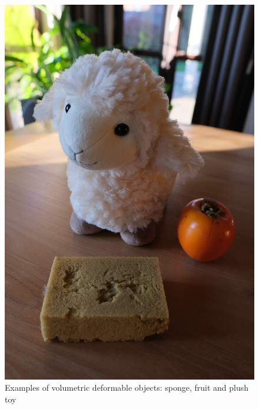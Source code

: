 \begin{figure}[htbp!]
    \centering
    \includegraphics[keepaspectratio,width=\textwidth]{figures/fig_3d_deformables_ex.JPG}
    \caption[Solid deformable objects]{Examples of volumetric deformable objects: sponge, fruit and plush toy}
    \label{fig:volumetric_deform_objects_examples}
\end{figure}
